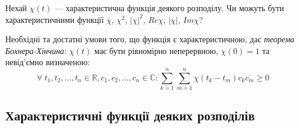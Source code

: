 \begin{exercise}
    Нехай $\chi(t)$ --- характеристична функція деякого розподілу. Чи можуть бути характеристичними функції $\overline{\chi}$, $\chi^2$, $|\chi|^2$, ${Re}\chi$, $|\chi|$, ${Im}\chi$? 
\end{exercise}

Необхідні та достатні умови того, що функція є характеристичною, дає
\emph{теорема Бохнера-Хінчина}: $\chi(t)$ має бути рівномірно неперервною, $\chi(0) = 1$ та 
невід'ємно визначеною: $$
    \forall \; t_1, t_2, ..., t_n \in \mathbb{R}, c_1, c_2, ..., c_n \in \mathbb{C}: 
    \sum\limits_{k=1}^n {\sum\limits_{m=1}^n \chi(t_k - t_m) c_k \overline{c_m}} \geq 0
$$

\subsection{Характеристичні функції деяких розподілів}
